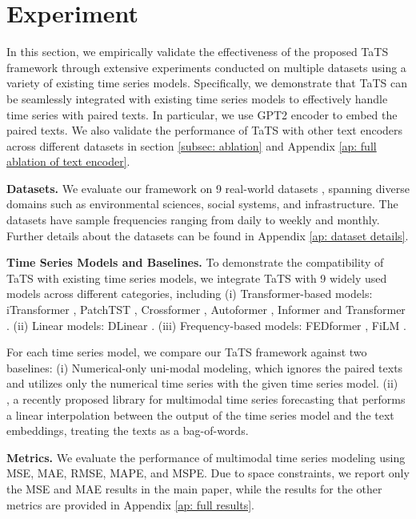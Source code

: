 \section{Experiment}



In this section, we empirically validate the effectiveness of the proposed TaTS framework through extensive experiments conducted on multiple datasets using a variety of existing time series models. Specifically, we demonstrate that TaTS can be seamlessly integrated with existing time series models to effectively handle time series with paired texts. In particular, we use GPT2 \cite{radford2019language} encoder to embed the paired texts. We also validate the performance of TaTS with other text encoders across different datasets in section \ref{subsec: ablation} and Appendix \ref{ap: full ablation of text encoder}.

\textbf{Datasets.} We evaluate our framework on 9 real-world datasets \cite{DBLP:journals/corr/abs-2406-08627}, spanning diverse domains such as environmental sciences, social systems, and infrastructure. The datasets have sample frequencies ranging from daily to weekly and monthly. Further details about the datasets can be found in Appendix \ref{ap: dataset details}.

\textbf{Time Series Models and Baselines.} To demonstrate the compatibility of TaTS with existing time series models, we integrate TaTS with 9 widely used models across different categories, including (i) Transformer-based models: iTransformer \cite{itransformer}, PatchTST \cite{patchtst}, Crossformer \cite{crossformer},   Autoformer \cite{autoformer}, Informer \cite{informer} and Transformer \cite{transformer}.
(ii) Linear models: DLinear \cite{dlinear}. (iii) Frequency-based models: FEDformer \cite{fedformer}, FiLM \cite{film}.

For each time series model, we compare our TaTS framework against two baselines: (i) Numerical-only uni-modal modeling, which ignores the paired texts and utilizes only the numerical time series with the given time series model. (ii) \multi \, \cite{DBLP:journals/corr/abs-2406-08627}, a recently proposed library for multimodal time series forecasting that performs a linear interpolation between the output of the time series model and the text embeddings, treating the texts as a bag-of-words.

\textbf{Metrics.} We evaluate the performance of multimodal time series modeling using MSE, MAE, RMSE, MAPE, and MSPE. Due to space constraints, we report only the MSE and MAE results in the main paper, while the results for the other metrics are provided in Appendix \ref{ap: full results}.




